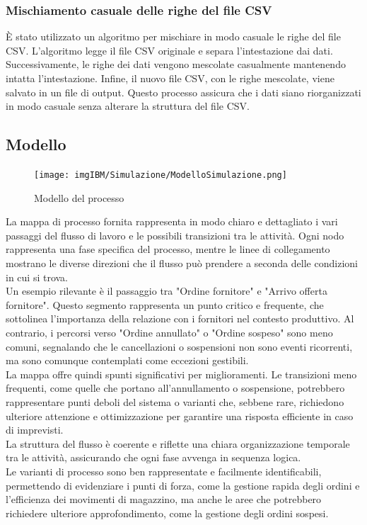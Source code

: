 \documentclass{article}
\begin{document}
\subsubsection{Mischiamento casuale delle righe del file CSV}
È stato utilizzato un algoritmo per mischiare in modo casuale le righe del file CSV. L'algoritmo legge il file CSV originale e separa l'intestazione dai dati. Successivamente, le righe dei dati vengono mescolate casualmente mantenendo intatta l'intestazione. Infine, il nuovo file CSV, con le righe mescolate, viene salvato in un file di output. Questo processo assicura che i dati siano riorganizzati in modo casuale senza alterare la struttura del file CSV.

\subsection{Modello}
\begin{figure}[H]
    \centering
    \texttt{[image: imgIBM/Simulazione/ModelloSimulazione.png]}
    \caption{Modello del processo}
    \label{fig:process-model}
\end{figure}
La mappa di processo fornita rappresenta in modo chiaro e dettagliato i vari passaggi del flusso di lavoro e le possibili transizioni tra le attività. Ogni nodo rappresenta una fase specifica del processo, mentre le linee di collegamento mostrano le diverse direzioni che il flusso può prendere a seconda delle condizioni in cui si trova.\\
Un esempio rilevante è il passaggio tra "Ordine fornitore" e "Arrivo offerta fornitore". Questo segmento rappresenta un punto critico e frequente, che sottolinea l'importanza della relazione con i fornitori nel contesto produttivo. Al contrario, i percorsi verso "Ordine annullato" o "Ordine sospeso" sono meno comuni, segnalando che le cancellazioni o sospensioni non sono eventi ricorrenti, ma sono comunque contemplati come eccezioni gestibili.\\
La mappa offre quindi spunti significativi per miglioramenti. Le transizioni meno frequenti, come quelle che portano all'annullamento o sospensione, potrebbero rappresentare punti deboli del sistema o varianti che, sebbene rare, richiedono ulteriore attenzione e ottimizzazione per garantire una risposta efficiente in caso di imprevisti.\\
La struttura del flusso è coerente e riflette una chiara organizzazione temporale tra le attività, assicurando che ogni fase avvenga in sequenza logica.\\
 Le varianti di processo sono ben rappresentate e facilmente identificabili, permettendo di evidenziare i punti di forza, come la gestione rapida degli ordini e l'efficienza dei movimenti di magazzino, ma anche le aree che potrebbero richiedere ulteriore approfondimento, come la gestione degli ordini sospesi.
\end{document}
